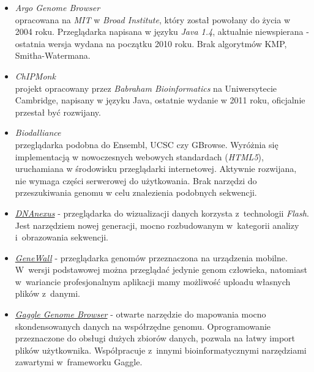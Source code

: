 \begin{itemize}
	\item \emph{Argo Genome Browser} \label{argo-genome-browser} \\
	opracowana na \textit{MIT} w \textit{Broad Institute}, który został powołany do życia w 2004 roku. 
	Przeglądarka napisana w języku \textit{Java 1.4}, aktualnie niewspierana - ostatnia wersja wydana na początku 2010 roku. Brak algorytmów KMP, Smitha-Watermana.
	
	\item \emph{ChIPMonk}\\
	projekt opracowany przez \textit{Babraham Bioinformatics} na Uniwersytecie Cambridge, napisany w języku Java, ostatnie wydanie w 2011 roku, oficjalnie przestał być rozwijany.
		
	\item \emph{Biodalliance}\\
	przeglądarka podobna do Ensembl, UCSC czy GBrowse. 
	Wyróżnia się implementacją w nowoczesnych webowych standardach (\textit{HTML5}), uruchamiana w środowisku przeglądarki internetowej. 
	Aktywnie rozwijana, nie wymaga części serwerowej do użytkowania. 
	Brak narzędzi do przeszukiwania genomu w celu znalezienia podobnych sekwencji.
	
	\item \href{https://www.dnanexus.com/genomes/hg18/public_browse}{\emph{DNAnexus}} \label{dnanexus} - przeglądarka do wizualizacji danych korzysta z~technologii \emph{Flash}. Jest narzędziem nowej generacji, mocno rozbudowanym w~kategorii analizy i~obrazowania sekwencji.
	
	\item \href{http://download.cnet.com/GeneWall-Genome-Browser-Pro/3000-2129_4-75855506.html}{\emph{GeneWall}} \label{genewall} - przeglądarka genomów przeznaczona na urządzenia mobilne. W~wersji podstawowej można przeglądać jedynie genom człowieka, natomiast w~wariancie profesjonalnym aplikacji mamy możliwość uploadu własnych plików z~danymi.
	
	\item \href{http://gaggle.systemsbiology.net/docs/geese/genomebrowser/}{\emph{Gaggle Genome Browser}} \label{gaggle} - otwarte narzędzie do mapowania mocno skondensowanych danych na współrzędne genomu. Oprogramowanie przeznaczone do obsługi dużych zbiorów danych, pozwala na łatwy import plików użytkownika. Współpracuje z~innymi bioinformatycznymi narzędziami zawartymi w~frameworku Gaggle.
	

\end{itemize}
